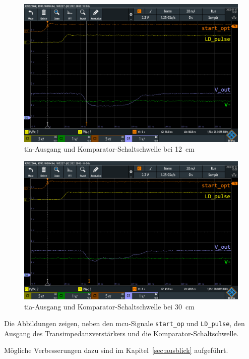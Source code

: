 \begin{figure}[H]
    \centering
    \includegraphics[width=\textwidth]{graphics/spiegel_12cm_dso_ok.png}
    \caption{\acrshort{tia}-Ausgang und Komparator-Schaltschwelle bei 12~cm}\label{fig:spiegel_12cm_dso_ok}
\end{figure}

\begin{figure}[H]
    \centering
    \includegraphics[width=\textwidth]{graphics/spiegel_30cm_dso_nok.png}
    \caption{\acrshort{tia}-Ausgang und Komparator-Schaltschwelle bei 30~cm}\label{fig:spiegel_30cm_dso_nok}
\end{figure}

Die Abbildungen zeigen, neben den \acrshort{mcu}-Signale \lstinline|start_op| und \lstinline|LD_pulse|, den Ausgang
des Transimpedanzverstärkers und die Komparator-Schaltschwelle.

Mögliche Verbesserungen dazu sind im Kapitel~\ref{sec:ausblick} aufgeführt. %

